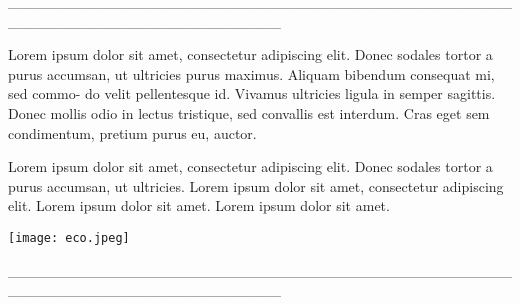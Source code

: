 \hspace*{-2cm}\_\_\_\_\_\_\_\_\_\_\_\_\_\_\_\_\_\_\_\_\_\_\_\_\_\_\_\_\_\_\_\_\_\_\_\_\_\_\_\_\_\_\_\_\_\_\_\_\_\_\_\_\_\_\_\_\_\_\_\_\_\_\_\_\_\_\_\_\_\_\_\_\_\_

\medskip

\noindent{}Lorem ipsum dolor sit amet, consectetur adipiscing elit.
Donec sodales tortor a purus accumsan, ut ultricies purus
maximus. Aliquam bibendum consequat mi, sed commo-
do velit pellentesque id. Vivamus ultricies ligula in semper
sagittis. Donec mollis odio in lectus tristique, sed convallis
est interdum. Cras eget sem condimentum, pretium purus
eu, auctor.

\hspace{.5cm}

\hspace*{-.4cm}\begin{minipage}[c]{0.45\linewidth}
\small{
{}}
\end{minipage}
\begin{minipage}[c]{0.50\linewidth}
\small{Lorem ipsum dolor sit amet, consectetur adipiscing elit.
Donec sodales tortor a purus accumsan, ut ultricies. Lorem ipsum dolor sit amet, consectetur adipiscing elit. Lorem ipsum dolor sit amet. Lorem ipsum dolor sit amet.} 
\end{minipage}

\pagebreak

\hspace{.5cm}

\begin{center}
\hspace*{-1cm}
\hspace{1cm}\texttt{[image: eco.jpeg]}
\end{center}

\hspace*{-2cm}\_\_\_\_\_\_\_\_\_\_\_\_\_\_\_\_\_\_\_\_\_\_\_\_\_\_\_\_\_\_\_\_\_\_\_\_\_\_\_\_\_\_\_\_\_\_\_\_\_\_\_\_\_\_\_\_\_\_\_\_\_\_\_\_\_\_\_\_\_\_\_\_\_\_

\medskip

